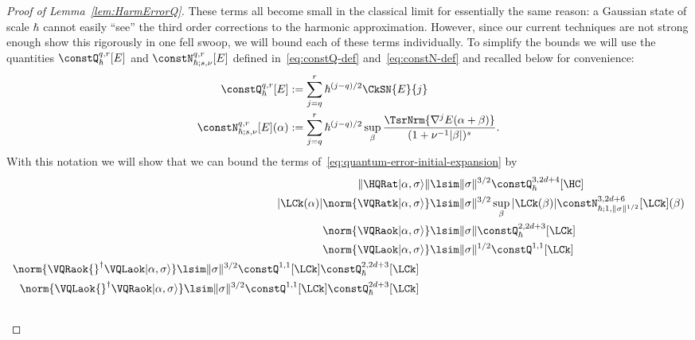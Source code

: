 \documentclass{article}
\numberwithin{equation}{section}
\begin{document}
\begin{proof}[Proof of Lemma~\ref{lem:HarmErrorQ}]
	These terms all become small in the classical limit for essentially the same reason: a Gaussian state of scale $\hbar$ cannot easily ``see'' the third order corrections to the harmonic approximation. However, since our current techniques are not strong enough show this rigorously in one fell swoop, we will bound each of these terms individually.  
    To simplify the bounds we will use the quantities 
    $\constQ^{q,r}_{\hbar}[E]$ and 
    $\constN^{q,r}_{\hbar;s,\nu}[E]$ defined in~\eqref{eq:constQ-def} and~\eqref{eq:constN-def} and recalled below for convenience:
\begin{align*}
\constQ^{q,r}_{\hbar}[E]
&:= \sum_{j=q}^r \hbar^{(j-q)/2}\CkSN{E}{j} \\
\constN^{q,r}_{\hbar;s,\nu}[E](\alpha)
&:= 
\sum_{j=q}^r \hbar^{(j-q)/2} 
\sup_\beta 
\frac{\TsrNrm{\nabla^jE(\alpha+\beta)}}{(1+\nu^{-1}|\beta|)^s}.
\end{align*}    
With this notation we will show that we can bound the terms of~\eqref{eq:quantum-error-initial-expansion} by
	\begin{align}
		\label{eq:HQR-term}
		\|\HQRat |\alpha,\sigma\rangle\|
		&\lsim
		\|\sigma\|^{3/2} 
        \constQ^{3,2d+4}_\hbar[\HC]
        \\
		\label{eq:VQR-term}
		|\LCk(\alpha)|
		\norm{ \VQRatk|\alpha,\sigma \rangle }
		&\lsim
        \|\sigma\|^{3/2}
        \sup_{\beta}
		 |\LCk(\beta)|
   \constN^{3,2d+6}_{\hbar;1,\|\sigma\|^{1/2}}[\LCk](\beta)
		\\
		\label{eq:VQlinear-term}
		\norm{ \VQRaok  |\alpha,\sigma \rangle}
		&\lsim
		\|\sigma\|
		\constQ^{2,2d+3}_{\hbar}[\LCk]
		\\
		\label{eq:Vmixed-term}
		\norm{ \VQLaok |\alpha,\sigma \rangle}
		&\lsim
        \|\sigma\|^{1/2}
        \constQ^{1,1}[\LCk]
		\\
		\label{eq:linear-outside-term}
		\begin{split}
			\norm{ \VQRaok{}^\dagger \VQLaok |\alpha,\sigma \rangle}
			&\lsim
			\|\sigma\|^{3/2}
			\constQ^{1,1}[\LCk] 
   \constQ^{2,2d+3}_{\hbar}[\LCk]
		\end{split}\\
		\label{eq:linear-inside-term}
		\begin{split}
			\norm{\VQLaok{}^\dagger \VQRaok |\alpha,\sigma \rangle}
			&\lsim
			\|\sigma\| ^{3/2}
			\constQ^{1,1}[\LCk] 
   \constQ^{2d+3}_{\hbar}[\LCk]
		\end{split}\\
		\label{eq:triple-moyal-term}
		\begin{split}

\end{split}
\end{align}
\end{proof}
\end{document}
